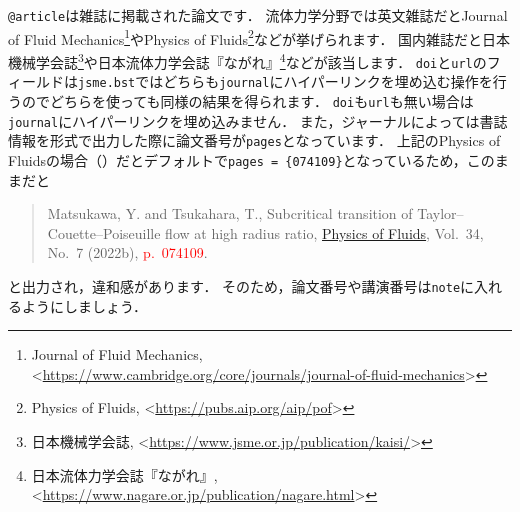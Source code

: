 \documentclass[a4paper,fleqn,uplatex,dvipdfmx]{jsarticle}
\makeatletter
\newcommand{\jsmefile}{\texttt{jsme.bst}}
\newcommand{\ttarticle}{\texttt{@article}}
\makeatother
\begin{document}
\ttarticle は雑誌に掲載された論文です．
流体力学分野では英文雑誌だとJournal of Fluid Mechanics\footnote{Journal of Fluid Mechanics, \textless\url{https://www.cambridge.org/core/journals/journal-of-fluid-mechanics}\textgreater}やPhysics of Fluids\footnote{Physics of Fluids, \textless\url{https://pubs.aip.org/aip/pof}\textgreater}などが挙げられます．
国内雑誌だと日本機械学会誌\footnote{日本機械学会誌, \textless\url{https://www.jsme.or.jp/publication/kaisi/}\textgreater}や日本流体力学会誌『ながれ』\footnote{日本流体力学会誌『ながれ』, \textless\url{https://www.nagare.or.jp/publication/nagare.html}\textgreater}などが該当します．
\verb|doi|と\verb|url|のフィールドは\jsmefile ではどちらも\verb|journal|にハイパーリンクを埋め込む操作を行うのでどちらを使っても同様の結果を得られます．
\verb|doi|も\verb|url|も無い場合は\verb|journal|にハイパーリンクを埋め込みません．
また，ジャーナルによっては書誌情報を\BibTeX{}形式で出力した際に論文番号が\verb|pages|となっています．
上記のPhysics of Fluidsの場合（\citealp{Matsukawa:PoF2022}）だとデフォルトで\verb|pages = {074109}|となっているため，このままだと
\begin{quote}
    Matsukawa, Y. and Tsukahara, T., Subcritical transition of Taylor--Couette--Poiseuille flow at high radius ratio, \href{https://doi.org/10.1063/5.0096676}{Physics of Fluids}, Vol.~34, No.~7 (2022b), \textcolor{red}{p.~074109}.
\end{quote}
と出力され，違和感があります．
そのため，論文番号や講演番号は\verb|note|に入れるようにしましょう．
\end{document}
